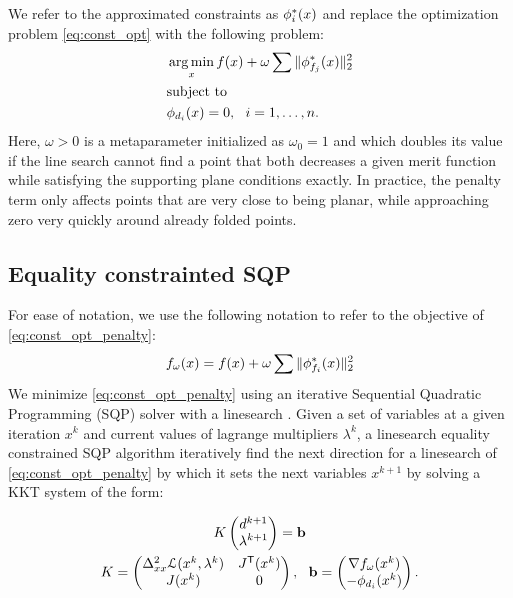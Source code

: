 We refer to the approximated constraints as $\phi^*_i(x)$ and replace the optimization problem \eqref{eq:const_opt} with the following problem:
\begin{equation} \label{eq:const_opt_penalty}
\begin{aligned}
& \operatorname*{arg\,min}_x f(x) + \omega \sum \|\phi^*_{f_j}(x)\|_2^2 \\
& \textrm{subject to} \\
& \phi_{d_i}(x) = 0, \ \  i = 1, \ldots, n. \\ 
\end{aligned}
\end{equation}
Here, $\omega > 0$ is a metaparameter initialized as $\omega_0 = 1$ and which doubles its value if the line search cannot find a point that both decreases a given merit function while satisfying the supporting plane conditions exactly. In practice, the penalty term only affects points that are very close to being planar, while approaching zero very quickly around already folded points.

\subsection{Equality constrainted SQP}
For ease of notation, we use the following notation to refer to the objective of \eqref{eq:const_opt_penalty}:
\begin{equation}
f_\omega(x) = f(x) + \omega \sum \|\phi^*_{f_i}(x)\|_2^2
\end{equation}
We minimize \eqref{eq:const_opt_penalty} using an iterative Sequential Quadratic Programming (SQP) solver with a linesearch \cite{nocedal}. Given a set of variables at a given iteration $x^k$ and current values of lagrange multipliers $\lambda^k$, a linesearch equality constrained SQP algorithm iteratively find the next direction for a linesearch of \eqref{eq:const_opt_penalty} by which it sets the next variables $x^{k+1}$ by solving a KKT system of the form:

\begin{equation} \label{eq:KKT_eps}
\begin{gathered}
{K} \begin{pmatrix} d^{k+1} \\ \lambda^{k+1} \end{pmatrix}=\mathbf{b} \\
{K}=\begin{pmatrix}
{\Delta^2_{xx}\mathcal{L}(x^k,\lambda^k)} & {J^\tr}(\x^k)\\
{J(\x^k)} &  0 \\
\end{pmatrix}, \ \ 
\mathbf{b}=\begin{pmatrix}
{\nabla f_\omega(x^k)} \\ 
-\phi_{d_i}(x^k)\\
\end{pmatrix}.
\end{gathered}
\end{equation}

